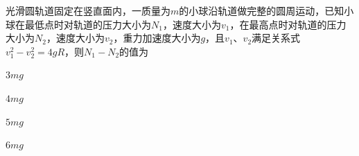 光滑圆轨道固定在竖直面内，一质量为\(m\)的小球沿轨道做完整的圆周运动，已知小球在最低点时对轨道的压力大小为\(N_1\)，速度大小为\(v_1\)，在最高点时对轨道的压力大小为\(N_2\)，速度大小为\(v_2\)，重力加速度大小为\(g\)，且\(v_1\)、\(v_2\)满足关系式\(v_1^2 - v_2^2 = 4gR\)，则\(N_1 - N_2\)的值为\paren[]
\begin{choices}
    \item \(3mg\)
    \item \(4mg\)
    \item \(5mg\)
    \item \(6mg\)
\end{choices}